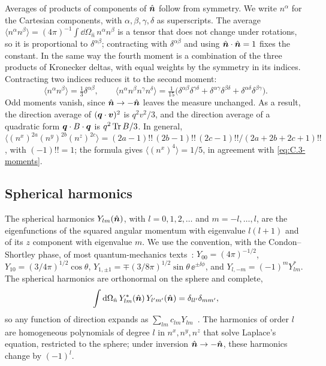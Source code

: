 Averages of products of components of $\hat{\bm{n}}$ follow from symmetry. We write $n^\alpha$ for the Cartesian components, with $\alpha, \beta, \gamma, \delta$ as superscripts. The average $\langle n^\alpha n^\beta\rangle = (4\pi)^{-1}\int\dd\Omega_{\hat n}\,n^\alpha n^\beta$ is a tensor that does not change under rotations, so it is proportional to $\delta^{\alpha\beta}$; contracting with $\delta^{\alpha\beta}$ and using $\hat{\bm{n}}\cdot\hat{\bm{n}} = 1$ fixes the constant. In the same way the fourth moment is a combination of the three products of Kronecker deltas, with equal weights by the symmetry in its indices. Contracting two indices reduces it to the second moment:
\begin{equation}
  \langle n^\alpha n^\beta\rangle = \tfrac13\delta^{\alpha\beta}, \qquad
  \langle n^\alpha n^\beta n^\gamma n^\delta\rangle = \tfrac{1}{15}\bigl(\delta^{\alpha\beta}\delta^{\gamma\delta} + \delta^{\alpha\gamma}\delta^{\beta\delta} + \delta^{\alpha\delta}\delta^{\beta\gamma}\bigr) .
  \label{eq:C.3-moments}
\end{equation}
Odd moments vanish, since $\hat{\bm{n}} \to -\hat{\bm{n}}$ leaves the measure unchanged. As a result, the direction average of $(\bm{q}\cdot\bm{v})^2$ is $q^2v^2/3$, and the direction average of a quadratic form $\bm{q}\cdot B\cdot\bm{q}$ is $q^2\operatorname{Tr} B/3$. In general, $\langle (n^x)^{2a}(n^y)^{2b}(n^z)^{2c}\rangle = (2a - 1)!!\,(2b - 1)!!\,(2c - 1)!!/(2a + 2b + 2c + 1)!!$, with $(-1)!! = 1$; the formula gives $\langle (n^x)^4\rangle = 1/5$, in agreement with \cref{eq:C.3-moments}.

\subsection{Spherical harmonics}

The spherical harmonics $Y_{lm}(\hat{\bm{n}})$, with $l = 0, 1, 2, \dots$ and $m = -l, \dots, l$, are the eigenfunctions of the squared angular momentum with eigenvalue $l(l + 1)$ and of its $z$ component with eigenvalue $m$. We use the convention, with the Condon--Shortley phase, of most quantum-mechanics texts~\cite[Eq.~(14.30.1)]{olver2010nist}: $Y_{00} = (4\pi)^{-1/2}$, $Y_{10} = (3/4\pi)^{1/2}\cos\theta$, $Y_{1,\pm1} = \mp(3/8\pi)^{1/2}\sin\theta\,\ee^{\pm\ii\phi}$, and $Y_{l,-m} = (-1)^mY_{lm}^*$. The spherical harmonics are orthonormal on the sphere and complete,
\begin{equation}
  \int\mathrm{d}\Omega_{\hat n}\,Y_{lm}^*(\hat{\bm{n}})\,Y_{l'm'}(\hat{\bm{n}}) = \delta_{ll'}\delta_{mm'} ,
  \label{eq:C.3-ortho}
\end{equation}
so any function of direction expands as $\sum_{lm}c_{lm}Y_{lm}$~\cite[Eq.~(14.30.8)]{olver2010nist}. The harmonics of order $l$ are homogeneous polynomials of degree $l$ in $n^x, n^y, n^z$ that solve Laplace's equation, restricted to the sphere; under inversion $\hat{\bm{n}} \to -\hat{\bm{n}}$, these harmonics change by $(-1)^l$.

